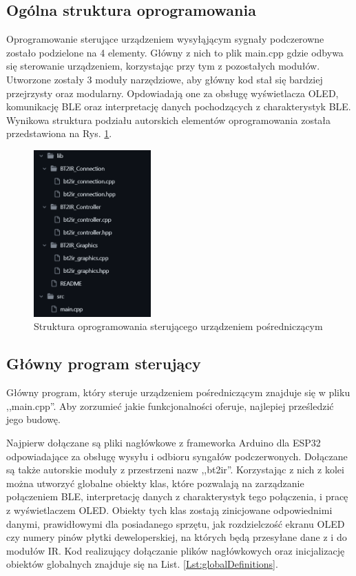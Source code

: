 \documentclass[12pt,twoside,draft]{article}
\begin{document}
\subsection{Ogólna struktura oprogramowania}
Oprogramowanie sterujące urządzeniem wysyłąjącym sygnały podczerowne zostało podzielone na 4 elementy. Główny z nich to plik main.cpp gdzie odbywa się sterowanie urządzeniem, korzystając przy tym z pozostałych modułów. Utworzone zostały 3 moduły narzędziowe, aby główny kod stał się bardziej przejrzysty oraz modularny. Opdowiadają one za obsługę wyświetlacza OLED, komunikację BLE oraz interpretację danych pochodzących z charakterystyk BLE. Wynikowa struktura podziału autorskich elementów oprogramowania została przedstawiona na Rys. \ref*{Fig:codeStructure}.
\begin{figure}[ht]
   \centering
   \includegraphics[width=4.5cm]{images/codeStructure.png}
   \caption{Struktura oprogramowania sterującego urządzeniem pośredniczącym}
   \label{Fig:codeStructure}
\end{figure}

\subsection{Główny program sterujący}
Główny program, który steruje urządzeniem pośredniczącym znajduje się w pliku ,,main.cpp''. Aby zorzumieć jakie funkcjonalności oferuje, najlepiej prześledzić jego budowę.

Najpierw dołączane są pliki nagłówkowe z frameworka Arduino dla ESP32 odpowiadające za obsługę wysyłu i odbioru syngałów podczerwonych. Dołączane są także autorskie moduły z przestrzeni nazw ,,bt2ir''. Korzystając z nich z kolei można utworzyć globalne obiekty klas, które pozwalają na zarządzanie połączeniem BLE, interpretację danych z charakterystyk tego połączenia, i pracę z  wyświetlaczem OLED. Obiekty tych klas zostają zinicjowane odpowiednimi danymi, prawidłowymi dla posiadanego sprzętu, jak rozdzielczość ekranu OLED czy numery pinów płytki deweloperskiej, na których będą przesyłane dane z i do modułów IR. Kod realizujący dołączanie plików nagłówkowych oraz inicjalizację obiektów globalnych znajduje się na List. \ref{Lst:globalDefinitions}.
\end{document}
